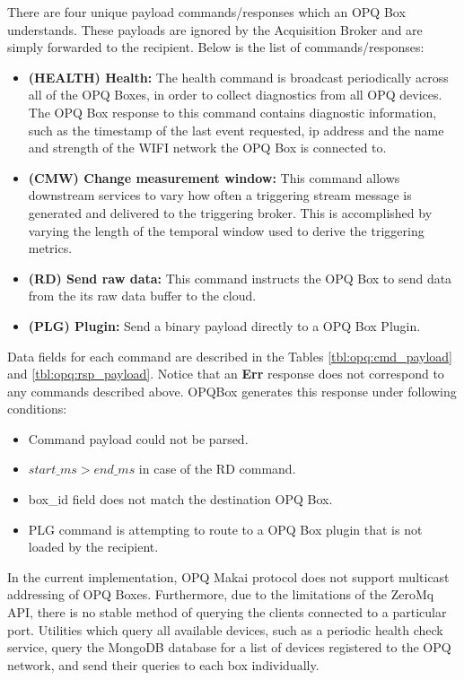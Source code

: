There are four unique payload commands/responses which an OPQ Box understands.
These payloads are ignored by the Acquisition Broker and are simply forwarded to the recipient.
Below is the list of commands/responses:
\begin{itemize}
	\item{\textbf{(HEALTH) Health:}} The health command is broadcast periodically across all of the OPQ Boxes, in order to collect diagnostics from all OPQ devices.
	The OPQ Box response to this command contains diagnostic information, such as the timestamp of the last event requested, ip address and the name and strength of the WIFI network the OPQ Box is connected to.
	\item{\textbf{(CMW) Change measurement window:}} This command allows downstream services to vary how often a triggering stream message is generated and delivered to the triggering broker.
	This is accomplished by varying the length of the temporal window used to derive the triggering metrics.
	\item{\textbf{(RD) Send raw data:}} This command instructs the OPQ Box to send data from the its raw data buffer to the cloud.
	\item {\textbf{(PLG) Plugin:}} Send a binary payload directly to a OPQ Box Plugin.
\end{itemize}
Data fields for each command are described in the Tables \ref{tbl:opq:cmd_payload} and \ref{tbl:opq:rsp_payload}.
Notice that an \textbf{Err} response does not correspond to any commands described above.
OPQBox generates this response under following conditions:
\begin{itemize}
	\item Command payload could not be parsed.
	\item $start\_ms > end\_ms$ in case of the RD command.
	\item box\_id field does not match the destination OPQ Box.
	\item PLG command is attempting to route to a OPQ Box plugin that is not loaded by the recipient.
\end{itemize}
In the current implementation, OPQ Makai protocol does not support multicast addressing of OPQ Boxes.
Furthermore, due to the limitations of the ZeroMq API, there is no stable method of querying the clients connected to a particular port.
Utilities which query all available devices, such as a periodic health check service, query the MongoDB database for a list of devices registered to the OPQ network, and send their queries to each box individually.
